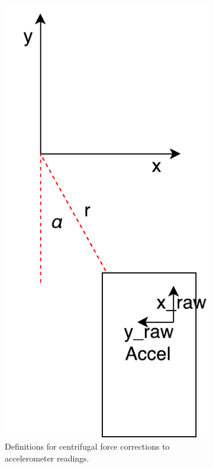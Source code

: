 \documentclass[letterpaper, 11pt]{article}
\begin{document}
\begin{enumerate}[label=\textbf{\arabic*.}]
\begin{figure}[ht]
    \centering
    \begin{subfigure}[t]{0.48\textwidth}
        \centering
        \includegraphics[height=0.4\textheight]{images/accel1.pdf}
        \caption{Definitions for centrifugal force corrections to accelerometer readings.}
        \label{fig:accel1}
    \end{subfigure}\hfill
    \begin{subfigure}[t]{0.48\textwidth}
        \centering

\end{subfigure}
\end{figure}
\end{enumerate}
\end{document}
